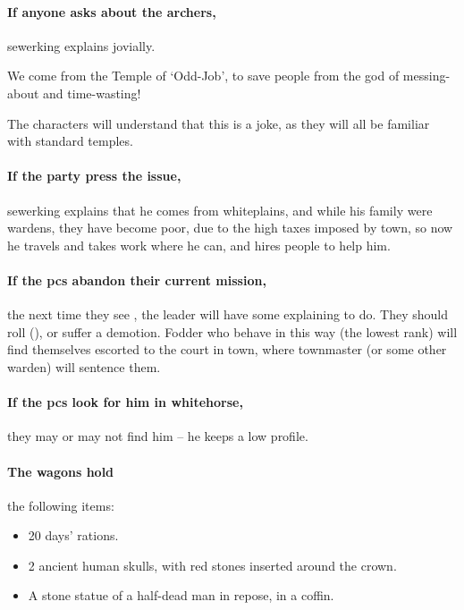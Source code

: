 \paragraph{If anyone asks about the archers,}
\gls{sewerking} explains jovially.

\null
\begin{speechtext}
  We come from the Temple of `Odd-Job', to save people from the god of messing-about and time-wasting!%
\end{speechtext}

The characters will understand that this is a joke, as they will all be familiar with standard temples.

\paragraph{If the party press the issue,}
\gls{sewerking} explains that he comes from \gls{whiteplains}, and while his family were \glspl{warden}, they have become poor, due to the high taxes imposed by \gls{town}, so now he travels and takes work where he can, and hires people to help him.

\paragraph{If the \glspl{pc} abandon their current mission,}
the next time they see , the leader will have some explaining to do.
They should roll  (\tn[12]), or suffer a demotion.
Fodder who behave in this way (the lowest rank) will find themselves escorted to the \gls{court} in \gls{town}, where \gls{townmaster} (or some other \gls{warden}) will sentence them.%

\paragraph{If the \glspl{pc} look for him in \gls{whitehorse},}
they may or may not find him -- he keeps a low profile.

\paragraph{The wagons hold}
the following items:

\begin{itemize}
  \item
  20 days' rations.
  \item
  2 ancient human skulls, with red stones inserted around the crown.
  \label{skullCrown}
  \item
  A stone statue of a half-dead man in repose, in a coffin.
\end{itemize}

